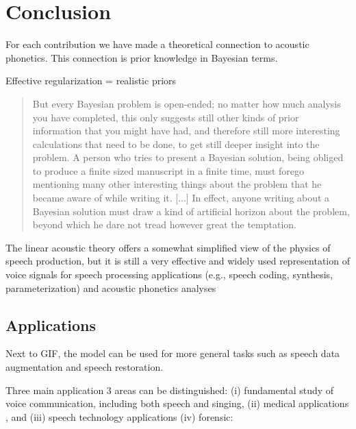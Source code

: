 \chapter{Conclusion\label{chapter:7}}


For each contribution we have made a theoretical connection to acoustic phonetics.
This connection is prior knowledge in Bayesian terms.

Effective regularization = realistic priors

\begin{quote}
    But every Bayesian problem is open-ended; no matter how much
analysis you have completed, this only suggests still other kinds of prior information that you might
have had, and therefore still more interesting calculations that need to be done, to get still deeper
insight into the problem.
A person who tries to present a Bayesian solution, being obliged to produce a finite sized
manuscript in a finite time, must forego mentioning many other interesting things about the problem
that he became aware of while writing it.
[...] In effect, anyone writing about a Bayesian solution must draw a kind of artificial horizon about
the problem, beyond which he dare not tread however great the temptation. 
\end{quote} %

The linear acoustic theory offers a somewhat simplified
view of the physics of speech production, but it is still a
very effective and widely used representation of voice signals for speech processing applications (e.g., speech coding,
synthesis, parameterization) and acoustic phonetics analyses \cite{Perrotin2021}

\section{Applications}

Next to GIF, the model can be used for more general tasks such as speech data augmentation and speech restoration.

Three main application 3 areas can be
distinguished: (i) fundamental study of voice communication, including both speech and singing,
(ii) medical applications \citep{Ng2008}, and (iii) speech technology applications
\citep{Alku2011}
(iv) forensic: \citep{Rose2002,Hughes2019,Bonastre2015,Becker2008,Nolan2001}

